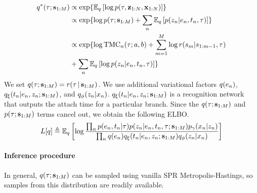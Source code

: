 \begin{equation}
\begin{split}
    q^*(\tree; \inducingpoints) 
    &\propto \exp{\E_\q\left[\log \p(\tree, \latentdataset, \dataset)\right]} \\
    &\propto \exp{\log \p(\tree ; \inducingpoints) + \sum_\n \E_\q\left[\p(\z_\n | e_\n, t_\n, \tree)\right]} \\
    &\propto \exp{\log \mathrm{TMC}_\n(\tree; a, b) + \sum_{m = 1}^M \log r(\inducingpoint_m | \inducingpoint_{1:m - 1}, \tree) \\&+ \sum_\n \E_\q\left[\log \p(\z_\n | e_\n, t_\n, \tree)\right]} \\
\end{split}
\end{equation}
We  set $q(\tau; \mathbf{s}_{1:M}) = r(\tau \,|\, \mathbf{s}_{1:M})$.
We use additional variational factors
$q(e_n)$,
$q_{\xi}(t_n | e_n, z_n; \mathbf{s}_{1:M})$,
and
$q_\phi(z_n | x_n)$.
$q_{\xi}(t_n | e_n, z_n; \mathbf{s}_{1:M})$ is a
recognition network that outputs
the attach time for a particular branch.
Since the $q(\tau; \mathbf{s}_{1:M})$ and $p(\tau; \mathbf{s}_{1:M})$ terms
cancel out, we obtain the following ELBO.
\begin{equation}
    \begin{split}
    L[q] &\triangleq \mathbb{E}_q \left[\log \frac{\prod_n p(e_n, t_n | \tau) p(z_n | e_n, t_n, \tau; \mathbf{s}_{1:M})p_\gamma(x_n | z_n)}{\prod_n q(e_n)q_{\xi}(t_n | e_n, z_n; \mathbf{s}_{1:M})q_\phi(z_n | x_n)}\right] \\
    \end{split}
\end{equation}

\paragraph{Inference procedure}
In general, $q(\tau; \mathbf{s}_{1:M})$ can
be sampled using vanilla SPR Metropolis-Hastings,
so samples from this distribution are readily available. 


